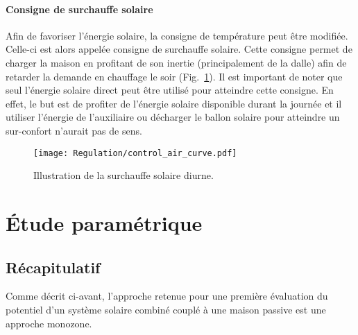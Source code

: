 \paragraph{Consigne de surchauffe solaire} %
\label{par:consigne_de_surchauffe_solaire}
Afin de favoriser l’énergie solaire, la consigne de température peut être modifiée.
Celle-ci est alors appelée consigne de surchauffe solaire. Cette consigne permet
de charger la maison en profitant de son inertie (principalement de la dalle) afin
de retarder la demande en chauffage le soir (Fig.~\ref{fig:surchauffe_solaire}). Il est important de noter que seul
l’énergie solaire direct peut être utilisé pour atteindre cette consigne. En effet,
le but est de profiter de l’énergie solaire disponible durant la journée et il utiliser
l’énergie de l’auxiliaire ou décharger le ballon solaire pour atteindre un sur-confort
n’aurait pas de sens.
\begin{figure}
    \begin{center}
        \texttt{[image: Regulation/control\_air\_curve.pdf]}
    \end{center}
    \caption{Illustration de la surchauffe solaire diurne.}
    \label{fig:surchauffe_solaire}
\end{figure}



\section{Étude paramétrique} %
\label{sec:etude_parametrique}


\subsection{Récapitulatif} %
\label{sub:récapitulatif}
Comme décrit ci-avant, l’approche retenue pour une première évaluation du potentiel
d’un système solaire combiné couplé à une maison passive est une approche monozone.


